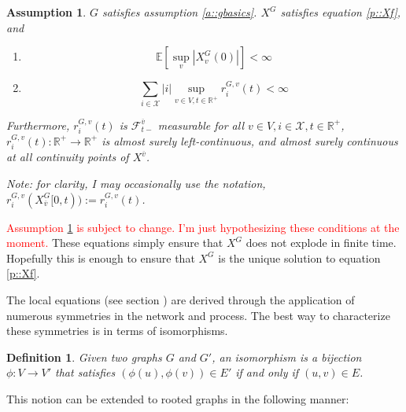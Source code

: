 \documentclass[12pt]{article}
\newcommand{\skipLine}{\vspace{12pt}}
\newcommand{\mb}{\mathbb}
\newcommand{\mc}{\mathcal}
\newcommand{\ra}{\rightarrow}
\newcommand{\ov}{\overline}
\newcommand{\tr}{\textcolor{red}}
\newcommand{\ind}{\hspace{24pt}}
\newcommand{\ex}[1]{\mb{E}\left[#1\right]}			%
\newcommand{\defeq}{:=}								%
\newcommand{\sta}{\mc{X}}							%
\newcommand{\cl}[1]{\ov{#1}}						%
\newcommand{\Xf}{X}									%
\newcommand{\rate}{r}								%
\newcommand{\F}{\mc{F}}								%
\newcommand{\vind}[1]{_{#1}}						%
\newcommand{\tme}[1]{(#1)}							%
\newcommand{\tmi}[1]{#1}							%
\newcommand{\gind}[1]{^{#1}}						%
\newcommand{\vpara}[1]{^{#1}}						%
\newcommand{\stpara}[1]{_{#1}}						%
\newcommand{\tpara}[1]{_{#1}}						%
\newcommand{\gvpara}[2]{^{#1,#2}}					%
\newtheorem{defn}[thms]{Definition}
\newtheorem{assu}[thms]{Assumption}
\begin{document}
\begin{assu}
\(G\) satisfies assumption \ref{a::gbasics}. \(\Xf\gind{G}\) satisfies equation \eqref{p::Xf}, and 
\begin{enumerate}
\item 

\begin{equation}
\ex{\sup_v |\Xf\gind{G}\vind{v}\tme{0}|} < \infty
\label{a::bddstart}
\end{equation}

\item 

\begin{equation}
\sum_{i \in \sta}|i|\sup_{v \in V,t \in \mb{R}^+} \rate\gvpara{G}{v}\stpara{i}\tme{t} < \infty
\label{a::bddjmp}
\end{equation}
\end{enumerate}

Furthermore, \(\rate\gvpara{G}{v}\stpara{i}\tme{t}\) is \(\F\vpara{\cl{v}}\tpara{t-}\) measurable for all \(v\in V,i \in \sta, t \in \mb{R}^+\), \(\rate\gvpara{G}{v}\stpara{i}\tme{t}: \mb{R}^+ \ra \mb{R}^+\) is almost surely left-continuous, and almost surely continuous at all continuity points of \(\Xf\vpara{\cl{v}}\).

\skipLine

Note: for clarity, I may occasionally use the notation, \(\rate\gvpara{G}{v}\stpara{i}(\Xf\gind{G}\vind{\cl{v}}\tmi{[0,t)}) \defeq \rate\gvpara{G}{v}\stpara{i}\tme{t}\).

\label{a::pbasics}
\end{assu}

\tr{Assumption \ref{a::pbasics} is subject to change. I'm just hypothesizing these conditions at the moment.} These equations simply ensure that \(\Xf\gind{G}\) does not explode in finite time. Hopefully this is enough to ensure that \(\Xf\gind{G}\) is the unique solution to equation \eqref{p::Xf}.

\ind The local equations (see section \iffalse\ref{}\fi) are derived through the application of numerous symmetries in the network and process. The best way to characterize these symmetries is in terms of isomorphisms.

\begin{defn}
Given two graphs \(G\) and \(G'\), an isomorphism is a bijection \(\phi: V \ra V'\) that satisfies \((\phi(u),\phi(v)) \in E'\) if and only if \((u,v) \in E\).
\label{a::iso}
\end{defn}

This notion can be extended to rooted graphs in the following manner:
\end{document}
